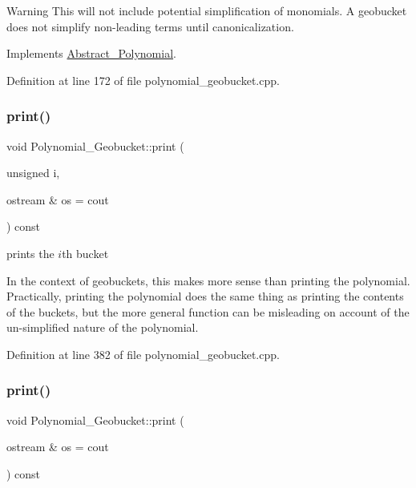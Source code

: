 \begin{DoxyWarning}{Warning}
This will not include potential simplification of monomials. A geobucket does not simplify non-\/leading terms until canonicalization. 
\end{DoxyWarning}


Implements \hyperlink{class_abstract___polynomial_a48f4c3c030ca66a9386cd71f71d5def7}{Abstract\+\_\+\+Polynomial}.



Definition at line 172 of file polynomial\+\_\+geobucket.\+cpp.

\mbox{\label{class_polynomial___geobucket_a672dd35e16935aaa5d5334283eab918e}} 
\subsubsection{\texorpdfstring{print()}{print()}\hspace{0.1cm}{\footnotesize\ttfamily [1/2]}}
{\footnotesize\ttfamily void Polynomial\+\_\+\+Geobucket\+::print (\begin{DoxyParamCaption}\item[{unsigned}]{i,  }\item[{ostream \&}]{os = {\ttfamily cout} }\end{DoxyParamCaption}) const\hspace{0.3cm}{\ttfamily [virtual]}}



prints the $i$th bucket 

In the context of geobuckets, this makes more sense than printing the polynomial. Practically, printing the polynomial does the same thing as printing the contents of the buckets, but the more general function can be misleading on account of the un-\/simplified nature of the polynomial. 

Definition at line 382 of file polynomial\+\_\+geobucket.\+cpp.

\mbox{\label{class_polynomial___geobucket_a90a039a358138a6e38a563ec6a9b4bc7}} 
\subsubsection{\texorpdfstring{print()}{print()}\hspace{0.1cm}{\footnotesize\ttfamily [2/2]}}
{\footnotesize\ttfamily void Polynomial\+\_\+\+Geobucket\+::print (\begin{DoxyParamCaption}\item[{ostream \&}]{os = {\ttfamily cout} }\end{DoxyParamCaption}) const\hspace{0.3cm}{\ttfamily [virtual]}}



